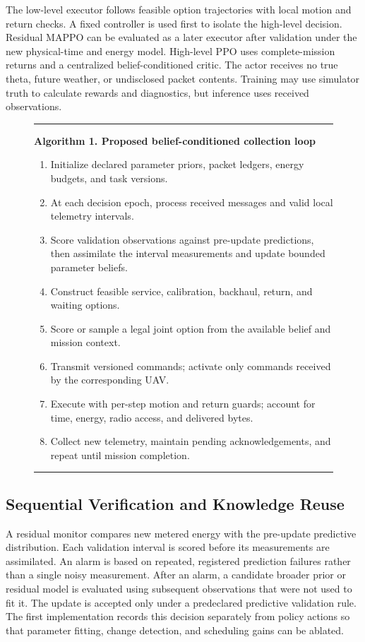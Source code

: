 \documentclass[10pt,twocolumn,letterpaper]{article}
\begin{document}
The low-level executor follows feasible option trajectories with local motion and return checks. A fixed controller is used first to isolate the high-level decision. Residual MAPPO \cite{yu2022mappo} can be evaluated as a later executor after validation under the new physical-time and energy model. High-level PPO \cite{schulman2017ppo} uses complete-mission returns and a centralized belief-conditioned critic. The actor receives no true theta, future weather, or undisclosed packet contents. Training may use simulator truth to calculate rewards and diagnostics, but inference uses received observations.

\begin{figure}[t]
\small\hrule\medskip
\textbf{Algorithm 1. Proposed belief-conditioned collection loop}
\begin{enumerate}
\item Initialize declared parameter priors, packet ledgers, energy budgets, and task versions.
\item At each decision epoch, process received messages and valid local telemetry intervals.
\item Score validation observations against pre-update predictions, then assimilate the interval measurements and update bounded parameter beliefs.
\item Construct feasible service, calibration, backhaul, return, and waiting options.
\item Score or sample a legal joint option from the available belief and mission context.
\item Transmit versioned commands; activate only commands received by the corresponding UAV.
\item Execute with per-step motion and return guards; account for time, energy, radio access, and delivered bytes.
\item Collect new telemetry, maintain pending acknowledgements, and repeat until mission completion.
\end{enumerate}\hrule
\end{figure}
\subsection{Sequential Verification and Knowledge Reuse}
A residual monitor compares new metered energy with the pre-update predictive distribution. Each validation interval is scored before its measurements are assimilated. An alarm is based on repeated, registered prediction failures rather than a single noisy measurement. After an alarm, a candidate broader prior or residual model is evaluated using subsequent observations that were not used to fit it. The update is accepted only under a predeclared predictive validation rule. The first implementation records this decision separately from policy actions so that parameter fitting, change detection, and scheduling gains can be ablated.
\end{document}
